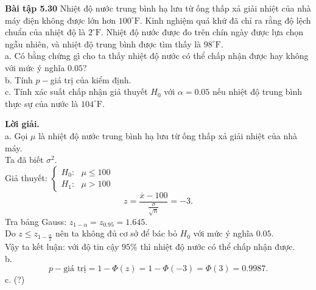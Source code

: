 \begin{mybox}
\textbf{Bài tập 5.30} Nhiệt độ nước trung bình hạ lưu từ ống thấp xả giải nhiệt của nhà máy điện không được lớn hơn $100 ^\circ \mathrm{F}.$ Kinh nghiệm quá khứ đã chỉ ra rằng độ lệch chuẩn của nhiệt độ là $2 ^\circ \mathrm{F}.$ Nhiệt độ nước được đo trên chín ngày được lựa chọn ngẫu nhiên, và nhiệt độ trung bình được tìm thấy là $98 ^\circ \mathrm{F}.$\\
a. Có bằng chứng gì cho ta thấy nhiệt độ nước có thể chấp nhận được hay không với mức ý nghĩa $0.05?$\\
b. Tính $p-$giá trị của kiểm định.\\
c. Tính xác suất chấp nhận giả thuyết $H_0$ với $\alpha = 0.05$ nếu nhiệt độ trung bình thực sự của nước là $104 ^\circ \mathrm{F}.$
\end{mybox}
\textbf{Lời giải.}\\
a. Gọi $\mu$ là nhiệt độ nước trung bình hạ lưu từ ống thấp xả giải nhiệt của nhà máy.\\
Ta đã biết $\sigma^2.$\\
Giả thuyết: $\begin{cases}
H_0: \text{ } \mu \leqslant 100\\
H_1: \text{ } \mu > 100
\end{cases} $ \\
$$z = \frac{\overline{x} - 100}{\frac{\sigma}{\sqrt{n}}} = -3.$$
Tra bảng Gauss: $z_{1 - \alpha} = z_{0.95} = 1.645.$\\
Do $z \leqslant z_{1 - \frac{\alpha}{2}}$ nên ta không đủ cơ sở để bác bỏ $H_0$ với mức ý nghĩa $0.05.$\\
Vậy ta kết luận: với độ tin cậy $95\%$ thì nhiệt độ nước có thể chấp nhận được.\\
b.
$$p-\text{giá trị} = 1 - \Phi \left( z \right) = 1 - \Phi \left( {-3} \right) = \Phi \left( 3 \right) = 0.9987.$$
c.  (?)


